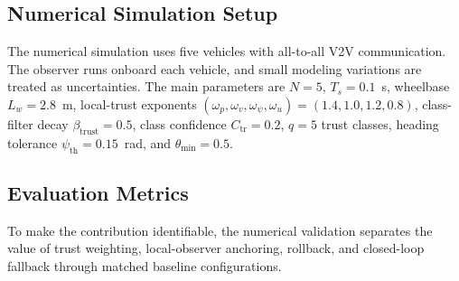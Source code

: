 \documentclass[journal,twoside]{IEEEtran}
\begin{document}
\subsection{Numerical Simulation Setup}

The numerical simulation uses five vehicles with all-to-all V2V communication. The observer runs onboard each vehicle, and small modeling variations are treated as uncertainties. The main parameters are $N=5$, $T_s=0.1$~s, wheelbase $L_w=2.8$~m, local-trust exponents $(\omega_p,\omega_v,\omega_\psi,\omega_u)=(1.4,1.0,1.2,0.8)$, class-filter decay $\beta_{\text{trust}}=0.5$, class confidence $C_{\mathrm{tr}}=0.2$, $q=5$ trust classes, heading tolerance $\psi_{\mathrm{th}}=0.15$~rad, and $\theta_{\min}=0.5$.

\subsection{Evaluation Metrics}
To make the contribution identifiable, the numerical validation separates the value of trust weighting, local-observer anchoring, rollback, and closed-loop fallback through matched baseline configurations.

\end{document}
